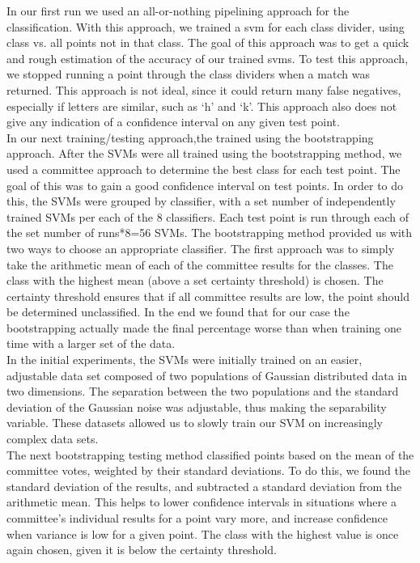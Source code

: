 \documentclass[journal]{IEEEtran}
\begin{document}
In our first run we used an all-or-nothing pipelining approach for the classification.  With this approach, we trained a svm for each class divider, using class vs. all points not in that class. The goal of this approach was to get a quick and rough estimation of the accuracy of our trained svms.  To test this approach, we stopped running a point through the class dividers when a match was returned.  This approach is not ideal, since it could return many false negatives, especially if letters are similar, such as ‘h’ and ‘k’.  This approach also does not give any indication of a confidence interval on any given test point.\\

In our next training/testing approach,the trained using the bootstrapping approach. After the SVMs were all trained using the bootstrapping method, we used a committee approach to determine the best class for each test point.  The goal of this was to gain a good confidence interval on test points.  In order to do this, the SVMs were grouped by classifier, with a set number of  independently trained SVMs per each of the 8 classifiers.  Each test point is run through each of the set number of runs*8=56 SVMs.  The bootstrapping method provided us with two ways to choose an appropriate classifier.  The first approach was to simply take the arithmetic mean of each of the committee results for the classes.  The class with the highest mean (above a set certainty threshold) is chosen.  The certainty threshold ensures that if all committee results are low, the point should be determined unclassified. In the end we found that for our case the bootstrapping actually made the final percentage worse than when training one time with a larger set of the data.\\

In the initial experiments, the SVMs were initially trained on an easier, adjustable data set composed of two populations of Gaussian distributed data in two dimensions. The separation between the two populations and the standard deviation of the Gaussian noise was adjustable, thus making the separability variable. These datasets allowed us to slowly train our SVM on increasingly complex data sets.\\

The next bootstrapping testing method classified points based on the mean of the committee votes, weighted by their standard deviations.  To do this, we found the standard deviation of the results, and subtracted a standard deviation from the arithmetic mean.   This helps to lower confidence intervals in situations where a committee’s individual results for a point vary more, and increase confidence when variance is low for a given point. The class with the highest value is once again chosen, given it is below the certainty threshold.\\
\end{document}
